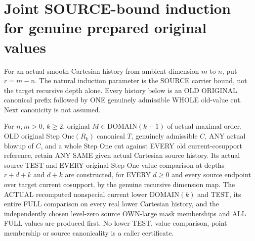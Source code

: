 \section{Joint SOURCE-bound induction for genuine prepared original values}

For an actual smooth Cartesian history from ambient dimension $m$ to
$n$, put $r=m-n$. The natural induction parameter is the SOURCE
carrier bound, not the target recursive depth alone. Every history
below is an OLD ORIGINAL canonical prefix followed by ONE genuinely
admissible WHOLE old-value cut. Next canonicity is not assumed.

\begin{theorem}
\label{hir:original-prepared-joint-source-bound-stepone-values}
\leanok
For $n,m>0$, $k\geq2$, original $M\in\mathrm{DOMAIN}(k+1)$ of
actual maximal order, OLD original Step One$(R_k)$ canonical $T$,
genuinely admissible $C$, ANY actual blowup of $C$, and a whole Step
One cut against EVERY old current-cosupport reference, retain ANY
SAME given actual Cartesian source history. Its actual source TEST
and EVERY original Step One value comparison at depths $r+d+k$ and
$d+k$ are constructed, for EVERY $d\geq0$ and every source endpoint
over target current cosupport, by the genuine recursive dimension map.
The ACTUAL recomputed nonspecial current lower DOMAIN$(k)$ and TEST,
its entire FULL comparison on every real lower Cartesian history, and
the independently chosen level-zero source OWN-large mask memberships
and ALL FULL values are produced first. No lower TEST, value comparison,
point membership or source canonicality is a caller certificate.
\end{theorem}
